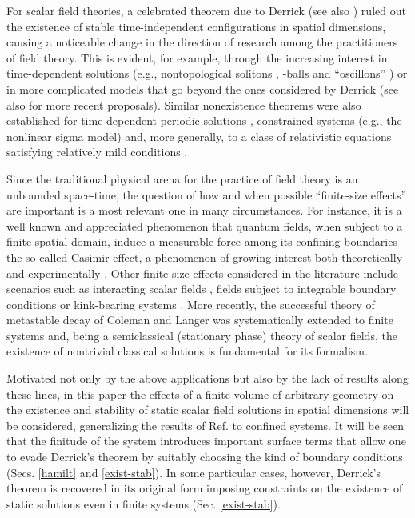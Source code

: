 \documentclass[a4paper,prd,twocolumn,showpacs,amsmath]{revtex4}
\begin{document}
For scalar field theories, a celebrated theorem due to Derrick \cite{derrick} (see also
\cite{dodd,rajaraman,coleman-book}) ruled out the existence of stable time-independent
configurations in \coordHE{} spatial dimensions, causing a noticeable change in the direction of research
among the practitioners of field theory. This is evident, for example, through the increasing interest in
time-dependent solutions (e.g., nontopological solitons \cite{lee}, \coordHE{}-balls \cite{coleman-qball}
and ``oscillons'' \cite{osc}) or in more complicated models that go beyond the ones considered by
Derrick \cite{rajaraman} (see also \cite{perivola} for more recent proposals).
Similar nonexistence theorems were also established for time-dependent periodic solutions
\cite{pagels}, constrained systems (e.g., the nonlinear sigma model) \cite{weder1} and, more generally,
to a class of relativistic equations satisfying relatively mild conditions \cite{weder2}.

Since the traditional physical arena for the practice of field theory is an unbounded space-time,
the question of how and when possible ``finite-size effects'' are important is a most relevant one in
many circumstances.
For instance, it is a well known and appreciated phenomenon that quantum fields, when subject to a finite
spatial domain, induce a measurable force among its confining boundaries - the so-called Casimir effect,
a phenomenon of growing interest both theoretically and experimentally \cite{casimir-review}.
Other finite-size effects considered in the literature include scenarios such as
interacting scalar fields \cite{carrillo}, fields subject to integrable boundary conditions \cite{bajnok}
or kink-bearing systems \cite{klassen}. More recently, the successful theory of metastable decay
of Coleman and Langer was systematically extended to finite systems \cite{maier-stein} and,
being a semiclassical (stationary phase) theory of scalar fields, the existence of nontrivial
classical solutions is fundamental for its formalism.

Motivated not only by the above applications but also by the lack of results along these lines, in
this paper the effects of a finite volume of arbitrary geometry on the existence and stability of
static scalar field solutions in \coordHE{} spatial dimensions will be considered, generalizing the results of
Ref. \cite{derrick} to confined systems. It will be seen that the finitude of
the system introduces important surface terms that allow one to evade Derrick's theorem by suitably choosing
the kind of boundary conditions (Secs. \ref{hamilt} and \ref{exist-stab}). In some particular cases, however,
Derrick's theorem is recovered in its original form imposing constraints on the existence of static solutions
even in finite systems (Sec. \ref{exist-stab}).
\end{document}
